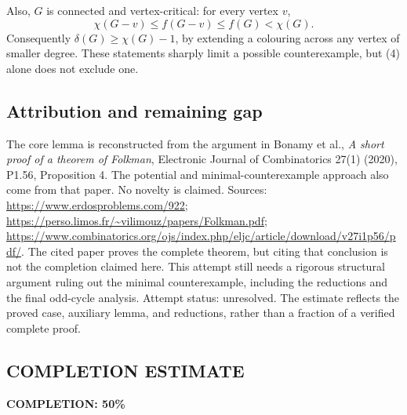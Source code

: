Also, \(G\) is connected and vertex-critical: for every vertex \(v\),
\[
 \chi(G-v)\leq f(G-v)\leq f(G)<\chi(G).
\]
Consequently \(\delta(G)\geq\chi(G)-1\), by extending a colouring across any vertex of smaller degree.
These statements sharply limit a possible counterexample, but (4) alone does not exclude one.

\subsection*{Attribution and remaining gap}
The core lemma is reconstructed from the argument in Bonamy et al., \emph{A short proof of a theorem of Folkman}, Electronic Journal of Combinatorics 27(1) (2020), P1.56, Proposition 4. The potential and minimal-counterexample approach also come from that paper. No novelty is claimed.
Sources: \url{https://www.erdosproblems.com/922};
\url{https://perso.limos.fr/~vilimouz/papers/Folkman.pdf};
\url{https://www.combinatorics.org/ojs/index.php/eljc/article/download/v27i1p56/pdf/}.
The cited paper proves the complete theorem, but citing that conclusion is not the completion claimed here. This attempt still needs a rigorous structural argument ruling out the minimal counterexample, including the reductions and the final odd-cycle analysis. Attempt status: unresolved. The estimate reflects the proved case, auxiliary lemma, and reductions, rather than a fraction of a verified complete proof.
\subsection*{COMPLETION ESTIMATE}
\textbf{COMPLETION: 50\%}

